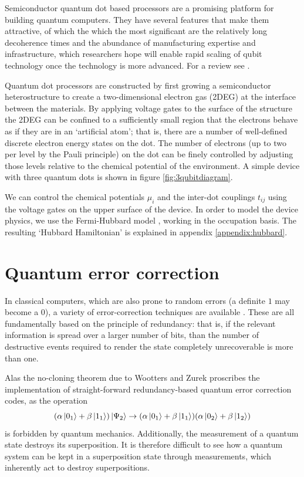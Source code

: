 \documentclass{report}
\begin{document}
Semiconductor quantum dot based processors are a promising platform for building quantum computers. They have several features that make them attractive, of which the which the most significant are the relatively long decoherence times \cite{Loss2022} and the abundance of manufacturing expertise and infrastructure, which researchers hope will enable rapid scaling of qubit technology once the technology is more advanced. For a review see \cite{Burkard2022}. 

Quantum dot processors are constructed by first growing a semiconductor heterostructure to create a two-dimensional electron gas (2DEG) at the interface between the materials. By applying voltage gates to the surface of the structure the 2DEG can be confined to a sufficiently small region that the electrons behave as if they are in an `artificial atom'; that is, there are a number of well-defined discrete electron energy states on the dot. The number of electrons (up to two per level by the Pauli principle) on the dot can be finely controlled by adjusting those levels relative to the chemical potential of the environment. A simple device with three quantum dots is shown in figure \ref{fig:3qubitdiagram}.

We can control the chemical potentials $\mu_i$ and the inter-dot couplings $t_{ij}$ using the voltage gates on the upper surface of the device. In order to model the device physics, we use the Fermi-Hubbard model \cite{Hubbard1963}, working in the occupation basis. The resulting `Hubbard Hamiltonian' is explained in appendix \ref{appendix:hubbard}.

\section{Quantum error correction}
In classical computers, which are also prone to random errors (a definite $1$ may become a $0$), a variety of error-correction techniques are available \cite{moon_2005}. These are all fundamentally based on the principle of redundancy: that is, if the relevant information is spread over a larger number of bits, than the number of destructive events required to render the state completely unrecoverable is more than one. 

Alas the no-cloning theorem due to Wootters and Zurek\cite{wootters_1982} proscribes the implementation of straight-forward redundancy-based quantum error correction codes, as the operation
\begin{equation*}
    (\alpha\ket{0_1} + \beta\ket{1_1})\ket{\Psi_2} \rightarrow (\alpha\ket{0_1} + \beta\ket{1_1})(\alpha\ket{0_2} + \beta\ket{1_2})
\end{equation*} is forbidden by quantum mechanics. Additionally, the measurement of a quantum state destroys its superposition. It is therefore difficult to see how a quantum system can be kept in a superposition state through measurements, which inherently act to destroy superpositions.
\end{document}
